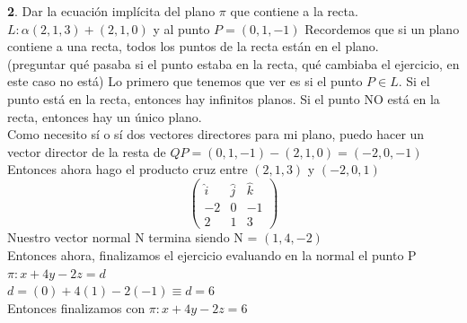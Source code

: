 \documentclass[10pt,a4paper]{article}
\begin{document}
\textbf{2}. Dar la ecuación implícita del plano $\pi$ que contiene a la recta. \\
$L:\alpha(2, 1, 3) + (2, 1, 0)$ y al punto $P=(0, 1, -1)$
Recordemos que si un plano contiene a una recta, todos los puntos de la recta están en el plano. \\
(preguntar qué pasaba si el punto estaba en la recta, qué cambiaba el ejercicio, en este caso no está)
Lo primero que tenemos que ver es si el punto $P \in L$. Si el punto está en la recta, entonces hay infinitos planos. Si el punto NO está en la recta, entonces hay un único plano. \\
Como necesito sí o sí dos vectores directores para mi plano, puedo hacer un vector director de la resta de $QP=(0, 1, -1) - (2, 1, 0) = (-2, 0, -1)$ \\
Entonces ahora hago el producto cruz entre $(2, 1, 3)$ y $(-2, 0, 1)$
\[
\begin{pmatrix}
\hat{i} & \hat{j} & \hat{k} \\
-2 & 0 & -1\\
2 & 1 & 3
\end{pmatrix}
\]
Nuestro vector normal N termina siendo N = $(1, 4, -2)$  \\
Entonces ahora, finalizamos el ejercicio evaluando en la normal el punto P $\pi:x+4y-2z=d$ \\
$d = (0) + 4(1) - 2(-1) \equiv d = 6$ \\
Entonces finalizamos con $\pi:x+4y-2z=6$ \\
\end{document}
